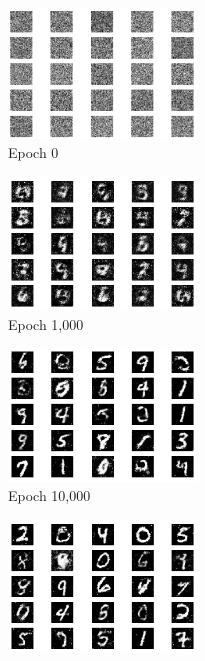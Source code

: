 \documentclass[a4paper]{article}    %
\begin{document}
\begin{figure}[H]
    \centering
    \begin{subfigure}{0.32\textwidth}
        \centering
        \includegraphics[width=5cm]{0}
        \caption{Epoch 0}
        \label{fig:fashion_mnist-epoch0}
    \end{subfigure}
    \hfill
    \begin{subfigure}{0.32\textwidth}
        \centering
        \includegraphics[width=5cm]{1000}
        \caption{Epoch 1,000}
        \label{fig:fashion_mnist-epoch1000}
    \end{subfigure}
    \hfill
    \begin{subfigure}{0.32\textwidth}
        \centering
        \includegraphics[width=5cm]{10000}
        \caption{Epoch 10,000}
        \label{fig:fashion_mnist-epoch10000}
    \end{subfigure}
    \hfill
    \begin{subfigure}{0.48\textwidth}
        \centering
        \includegraphics[width=5cm]{20000}

\end{subfigure}
\end{figure}
\end{document}
